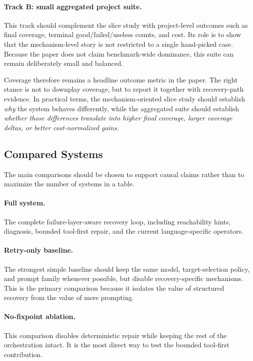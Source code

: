\documentclass[10pt]{article}
\begin{document}
\paragraph{Track B: small aggregated project suite.}
This track should complement the slice study with project-level outcomes such as final coverage, terminal good/failed/useless counts, and cost. Its role is to show that the mechanism-level story is not restricted to a single hand-picked case. Because the paper does not claim benchmark-wide dominance, this suite can remain deliberately small and balanced.

Coverage therefore remains a headline outcome metric in the paper. The right stance is not to downplay coverage, but to report it together with recovery-path evidence. In practical terms, the mechanism-oriented slice study should establish \emph{why} the system behaves differently, while the aggregated suite should establish \emph{whether those differences translate into higher final coverage, larger coverage deltas, or better cost-normalized gains}.

\subsection{Compared Systems}

The main comparisons should be chosen to support causal claims rather than to maximize the number of systems in a table.

\paragraph{Full system.}
The complete failure-layer-aware recovery loop, including reachability hints, diagnosis, bounded tool-first repair, and the current language-specific operators.

\paragraph{Retry-only baseline.}
The strongest simple baseline should keep the same model, target-selection policy, and prompt family whenever possible, but disable recovery-specific mechanisms. This is the primary comparison because it isolates the value of structured recovery from the value of mere prompting.

\paragraph{No-fixpoint ablation.}
This comparison disables deterministic repair while keeping the rest of the orchestration intact. It is the most direct way to test the bounded tool-first contribution.
\end{document}
